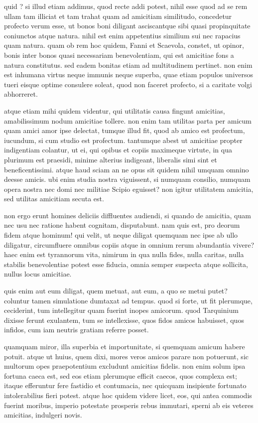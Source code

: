  quid ? si illud etiam addimus, quod recte addi potest, nihil esse quod ad se rem ullam tam illiciat et tam trahat quam ad amicitiam similitudo, concedetur profecto verum esse, ut bonos boni diligant asciscantque sibi quasi propinquitate coniunctos atque natura. nihil est enim appetentius similium sui nec rapacius quam natura. quam ob rem hoc quidem, Fanni et Scaevola, constet, ut opinor, bonis inter bonos quasi necessariam benevolentiam, qui est amicitiae fons a natura constitutus. sed eadem bonitas etiam ad multitudinem pertinet. non enim est inhumana virtus neque immunis neque superba, quae etiam populos universos tueri eisque optime consulere soleat, quod non faceret profecto, si a caritate volgi abhorreret.

 atque etiam mihi quidem videntur, qui utilitatis causa fingunt amicitias, amabilissimum nodum amicitiae tollere. non enim tam utilitas parta per amicum quam amici amor ipse delectat, tumque illud fit, quod ab amico est profectum, iucundum, si cum studio est profectum. tantumque abest ut amicitiae propter indigentiam colantur, ut ei, qui opibus et copiis maximeque virtute, in qua plurimum est praesidi, minime alterius indigeant, liberalis simi sint et beneficentissimi. atque haud sciam an ne opus sit quidem nihil umquam omnino deesse amicis. ubi enim studia nostra viguissent, si numquam consilio, numquam opera nostra nec domi nec militiae Scipio eguisset? non igitur utilitatem amicitia, sed utilitas amicitiam secuta est.

 non ergo erunt homines deliciis diffluentes audiendi, si quando de amicitia, quam nec usu nec ratione habent cognitam, disputabunt. nam quis est, pro deorum fidem atque hominum! qui velit, ut neque diligat quemquam nec ipse ab ullo diligatur, circumfluere omnibus copiis atque in omnium rerum abundantia vivere? haec enim est tyrannorum vita, nimirum in qua nulla fides, nulla caritas, nulla stabilis benevolentiae potest esse fiducia, omnia semper suspecta atque sollicita, nullus locus amicitiae.

 quis enim aut eum diligat, quem metuat, aut eum, a quo se metui putet? coluntur tamen simulatione dumtaxat ad tempus. quod si forte, ut fit plerumque, ceciderint, tum intellegitur quam fuerint inopes amicorum. quod Tarquinium dixisse ferunt exulantem, tum se intellexisse, quos fidos amicos habuisset, quos infidos, cum iam neutris gratiam referre posset.

 quamquam miror, illa superbia et importunitate, si quemquam amicum habere potuit. atque ut huius, quem dixi, mores veros amicos parare non potuerunt, sic multorum opes praepotentium excludunt amicitias fidelis. non enim solum ipsa fortuna caeca est, sed eos etiam plerumque efficit caecos, quos complexa est; itaque efferuntur fere fastidio et contumacia, nec quicquam insipiente fortunato intolerabilius fieri potest. atque hoc quidem videre licet, eos, qui antea commodis fuerint moribus, imperio potestate prosperis rebus immutari, sperni ab eis veteres amicitias, indulgeri novis.

